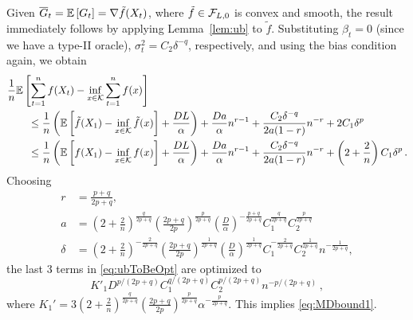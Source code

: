 Given $\overline{G}_t=\mathbb{E}\left[G_t\right] = \nabla \tilde{f}(X_t)$, where $\tilde{f}\in \mathcal{F}_{L,0}$ is convex and smooth,
the result immediately follows by applying Lemma~\ref{lem:ub} to $\tilde{f}$.
Substituting
 $\beta_t = 0$ (since we have a type-II oracle), $\sigma^2_t = C_2 \delta^{-q}$, respectively, and using the bias condition again, we obtain
 \begin{align}
\MoveEqLeft
\frac{1}{n} \EE{ \sum_{t=1}^n f( X_t) - \inf_{x \in \cK} \sum_{t=1}^n f(x)} \nonumber \\
&\le \frac{1}{n}\left(\EE{\tilde{f}(X_1)-\inf_{x \in \cK}\tilde{f}(x)}+\frac{DL}{\alpha}  \right) %
+\frac{Da}{\alpha} n^{r-1}+\dfrac{C_2 \delta^{-q}}{2a(1-r)}n^{-r}+ 2 C_1\delta^p \\
&\le \frac{1}{n}\left(\EE{f(X_1)-\inf_{x \in \cK}f(x)}+\frac{DL}{\alpha}  \right) %
+\frac{Da}{\alpha} n^{r-1}+\dfrac{C_2 \delta^{-q}}{2a(1-r)}n^{-r}+ \left(2+\dfrac{2}{n}\right)C_1\delta^p \,.
\label{eq:ubToBeOpt}
 \end{align}
 Choosing 
 \begin{align*} 
 r &= \tfrac{p+q}{2p+q}, \\  
a&= \left(2+\tfrac{2}{n}\right)^{\frac{q}{2p+q}}\left(\tfrac{2p+q}{2p}\right)^{\frac{p}{2p+q}} \left(\tfrac{D}{\alpha}\right)^{-\frac{p+q}{2p+q}}  C_1^{\frac{q}{2p+q}} C_2^{\frac{p}{2p+q}} \\
 \delta &=  \left(2+\tfrac{2}{n}\right)^{-\frac{2}{2p+q}}\left(\tfrac{2p+q}{2p}\right)^{\frac{1}{2p+q}} \left(\tfrac{D}{\alpha}\right)^{\frac{1}{2p+q}}  C_1^{-\frac{2}{2p+q}} C_2^{\frac{1}{2p+q}} n^{-\frac{1}{2p+q}}, 
 \end{align*}
the last $3$ terms in \eqref{eq:ubToBeOpt} are optimized to
 \[
 K'_1 D^{p/(2p+q)} C_1^{q/(2p+q)} C_2^{p/(2p+q)} n ^{-p/(2p+q)} \,,
 \]
where $K_1'= 3\left(2+\frac{2}{n}\right)^{\frac{q}{2p+q}}\left(\frac{2p+q}{2p}\right)^{\frac{p}{2p+q}}  \alpha^{-\frac{p}{2p+q}}$.
 This implies \eqref{eq:MDbound1}.
 
